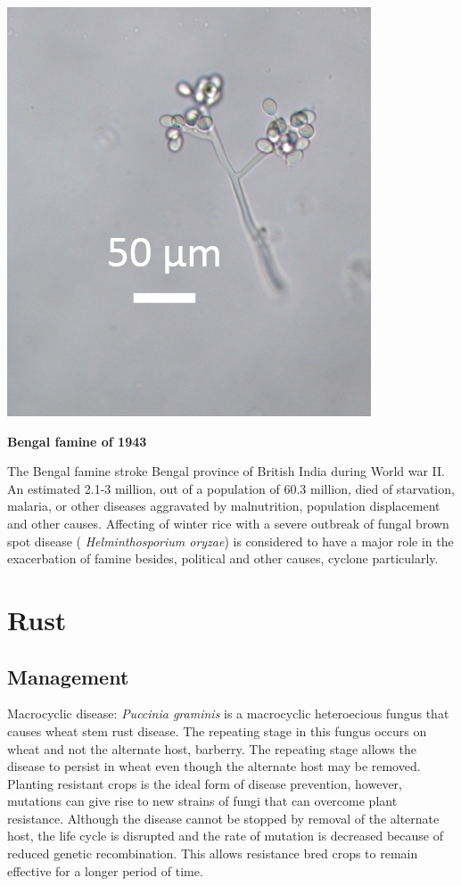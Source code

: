 \documentclass[
  openany]{book}
\begin{document}
\begin{center}\includegraphics[width=0.8\linewidth]{./images/Plasmopara_vitticola} \end{center}

\textbf{Bengal famine of 1943}

The Bengal famine stroke Bengal province of British India during World war II. An estimated 2.1-3 million, out of a population of 60.3 million, died of starvation, malaria, or other diseases aggravated by malnutrition, population displacement and other causes. Affecting of winter rice with a severe outbreak of fungal brown spot disease ( \emph{Helminthosporium oryzae}) is considered to have a major role in the exacerbation of famine besides, political and other causes, cyclone particularly.

\hypertarget{rust}{%
\section{Rust}\label{rust}}

\hypertarget{management}{%
\subsection{Management}\label{management}}

Macrocyclic disease: \emph{Puccinia graminis} is a macrocyclic heteroecious fungus that causes wheat stem rust disease. The repeating stage in this fungus occurs on wheat and not the alternate host, barberry. The repeating stage allows the disease to persist in wheat even though the alternate host may be removed. Planting resistant crops is the ideal form of disease prevention, however, mutations can give rise to new strains of fungi that can overcome plant resistance. Although the disease cannot be stopped by removal of the alternate host, the life cycle is disrupted and the rate of mutation is decreased because of reduced genetic recombination. This allows resistance bred crops to remain effective for a longer period of time.
\end{document}
